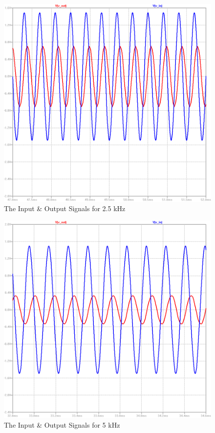 \documentclass[paper]{IEEEtran}
\begin{document}
\begin{figure}[H]
	\setlength{\unitlength}{\textwidth}
	\center 
	\includegraphics[width=0.45\unitlength]{lpf_op4.png}
	\caption{\label{fig:lpfop4}The Input \& Output Signals for 2.5 kHz}
\end{figure} 


\begin{figure}[H]
	\setlength{\unitlength}{\textwidth}
	\center 
	\includegraphics[width=0.45\unitlength]{lpf_op5.png}
	\caption{\label{fig:lpfop5}The Input \& Output Signals for 5 kHz}
\end{figure} 
\end{document}
